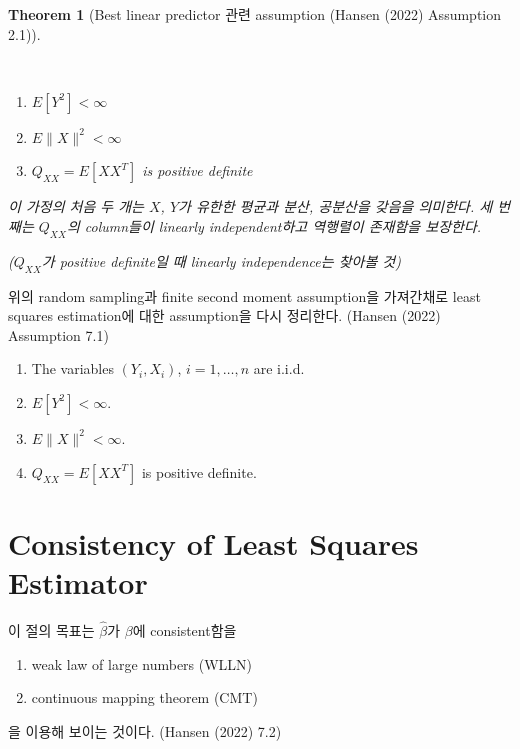 \documentclass[
  letterpaper,
  DIV=11,
  numbers=noendperiod]{scrreprt}
\providecommand{\tightlist}{%
  \setlength{\itemsep}{0pt}\setlength{\parskip}{0pt}}\usepackage{longtable,booktabs,array}
\theoremstyle{definition}
\theoremstyle{plain}
\newtheorem{theorem}{Theorem}[chapter]
\theoremstyle{definition}
\theoremstyle{definition}
\theoremstyle{remark}
\begin{document}
\begin{theorem}[Best linear predictor 관련 assumption (Hansen (2022)
Assumption 2.1)]\protect\hypertarget{thm-blp}{}\label{thm-blp}

~

\begin{enumerate}
\def\labelenumi{\arabic{enumi}.}
\tightlist
\item
  \(E[Y^2]<\infty\)
\item
  \(E\|X\|^2 < \infty\)
\item
  \(Q_{XX} = E[XX^T]\) is positive definite
\end{enumerate}

이 가정의 처음 두 개는 \(X\), \(Y\)가 유한한 평균과 분산, 공분산을
갖음을 의미한다. 세 번째는 \(Q_{XX}\)의 column들이 linearly
independent하고 역행렬이 존재함을 보장한다.

(\(Q_{XX}\)가 positive definite일 때 linearly independence는 찾아볼 것)

\end{theorem}

위의 random sampling과 finite second moment assumption을 가져간채로
least squares estimation에 대한 assumption을 다시 정리한다. (Hansen
(2022) Assumption 7.1)

\begin{enumerate}
\def\labelenumi{\arabic{enumi}.}
\tightlist
\item
  The variables \((Y_i, X_i)\), \(i=1,\ldots, n\) are i.i.d.
\item
  \(E[Y^2]<\infty\).
\item
  \(E\|X\|^2<\infty\).
\item
  \(Q_{XX} = E[XX^T]\) is positive definite.
\end{enumerate}

\section{Consistency of Least Squares
Estimator}\label{consistency-of-least-squares-estimator}

이 절의 목표는 \(\hat{\beta}\)가 \(\beta\)에 consistent함을

\begin{enumerate}
\def\labelenumi{\arabic{enumi}.}
\tightlist
\item
  weak law of large numbers (WLLN)
\item
  continuous mapping theorem (CMT)
\end{enumerate}

을 이용해 보이는 것이다. (Hansen (2022) 7.2)
\end{document}
